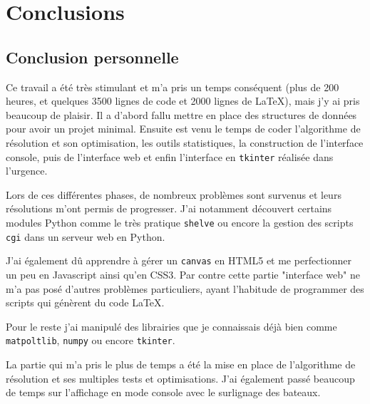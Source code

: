 \chapter{Conclusions}
\section{Conclusion personnelle}
Ce travail a été très stimulant et m'a pris un temps conséquent (plus de 200 heures, et quelques 3500 lignes de code et 2000 lignes de \LaTeX), mais j'y ai pris beaucoup de plaisir. Il a d'abord fallu mettre en place des structures de données pour avoir un projet minimal. Ensuite est venu le temps de coder l'algorithme de résolution et son optimisation, les outils statistiques, la construction de l'interface console, puis de l'interface web et enfin l'interface en \texttt{tkinter} réalisée dans l'urgence. 

Lors de ces différentes phases, de nombreux problèmes sont survenus et leurs résolutions m'ont permis de progresser. J'ai notamment découvert certains modules Python comme le très pratique \texttt{shelve} ou encore la gestion des scripts \texttt{cgi} dans un serveur web en Python. 

J'ai également dû apprendre à gérer un \texttt{canvas} en HTML5 et me perfectionner un peu en Javascript ainsi qu'en CSS3. 
Par contre cette partie "interface web" ne m'a pas posé d'autres problèmes particuliers, ayant l'habitude de programmer des scripts qui génèrent du code \LaTeX. 

Pour le reste j'ai manipulé des librairies que je connaissais déjà bien comme \texttt{matpoltlib}, \texttt{numpy} ou encore \texttt{tkinter}. 

La partie qui m'a pris le plus de temps a été la mise en place de l'algorithme de résolution et ses multiples tests et optimisations. J'ai également passé beaucoup de temps sur l'affichage en mode console avec le surlignage des bateaux.

%


